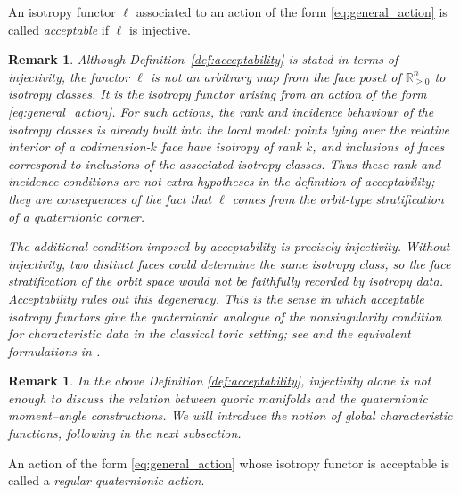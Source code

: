 \documentclass[11pt,a4paper]{article}
\numberwithin{equation}{section}
\newtheorem{remark}[definition]{Remark}
\theoremstyle{named}
\begin{document}
\begin{definition}\label{def:acceptability}
An isotropy functor \(\ell\) associated to an action of the form
\eqref{eq:general_action} is called \emph{acceptable} if \(\ell\) is
injective.
\end{definition}

\begin{remark}\label{rmk:acceptability_rank_incidence}
Although Definition~\ref{def:acceptability} is stated in terms of injectivity, the functor \(\ell\) is not an arbitrary map from the face poset of \(\mathbb R_{\ge0}^{n}\) to isotropy classes. It is the isotropy functor arising from an action of the form \eqref{eq:general_action}. For such actions, the rank and incidence behaviour of the isotropy classes is already built into the local model: points lying over the relative interior of a codimension-\(k\) face have isotropy of rank \(k\), and inclusions of faces correspond to inclusions of the associated isotropy classes. Thus these rank and incidence conditions are not extra hypotheses in the definition of acceptability; they are consequences of the fact that \(\ell\) comes from the orbit-type stratification of a quaternionic corner.

The additional condition imposed by acceptability is precisely injectivity.  Without injectivity, two distinct faces could determine the same isotropy class, so the face stratification of the orbit space would not be faithfully recorded by isotropy data.  Acceptability rules out this degeneracy.  This is the sense in which acceptable isotropy functors give the quaternionic analogue of the nonsingularity condition for characteristic data in the classical toric setting; see \cite[Proposition~3.1.23]{ho} and the equivalent formulations in \cite[p.~60]{ho}.
\end{remark}

\begin{remark}
In the above Definition \ref{def:acceptability}, injectivity alone is not enough to discuss the relation between quoric manifolds and the quaternionic moment--angle constructions. We will introduce the notion of global characteristic functions, following \cite[\S 5]{ho} in the next subsection.
\end{remark}

\begin{definition}
An action of the form \eqref{eq:general_action} whose isotropy functor is acceptable is called a \emph{regular quaternionic action}.
\end{definition}
\end{document}
